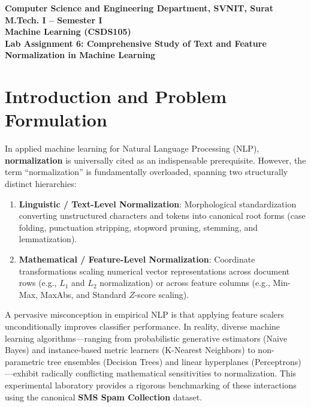 \documentclass[12pt]{article}
\begin{document}

\begin{center}
\textbf{Computer Science and Engineering Department, SVNIT, Surat}\\
\textbf{M.Tech. I -- Semester I}\\
\textbf{Machine Learning (CSDS105)}\\
\textbf{Lab Assignment 6: Comprehensive Study of Text and Feature Normalization in Machine Learning}
\end{center}

\vspace{0.3cm}

\section{Introduction and Problem Formulation}

In applied machine learning for Natural Language Processing (NLP), \textbf{normalization} is universally cited as an indispensable prerequisite. However, the term ``normalization'' is fundamentally overloaded, spanning two structurally distinct hierarchies:
\begin{enumerate}
    \item \textbf{Linguistic / Text-Level Normalization}: Morphological standardization converting unstructured characters and tokens into canonical root forms (case folding, punctuation stripping, stopword pruning, stemming, and lemmatization).
    \item \textbf{Mathematical / Feature-Level Normalization}: Coordinate transformations scaling numerical vector representations across document rows (e.g., $L_1$ and $L_2$ normalization) or across feature columns (e.g., Min-Max, MaxAbs, and Standard $Z$-score scaling).
\end{enumerate}

A pervasive misconception in empirical NLP is that applying feature scalers unconditionally improves classifier performance. In reality, diverse machine learning algorithms—ranging from probabilistic generative estimators (Naive Bayes) and instance-based metric learners (K-Nearest Neighbors) to non-parametric tree ensembles (Decision Trees) and linear hyperplanes (Perceptrons)—exhibit radically conflicting mathematical sensitivities to normalization. This experimental laboratory provides a rigorous benchmarking of these interactions using the canonical \textbf{SMS Spam Collection} dataset.
\end{document}
